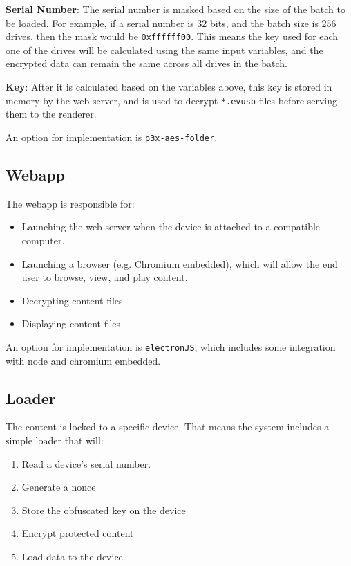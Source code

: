 \documentclass{article}
\begin{document}
{\bf Serial Number}: The serial number is masked based on the size of
the batch to be loaded.  For example, if a serial number is 32 bits,
and the batch size is 256 drives, then the mask would be \verb+0xffffff00+.
This means the key used for each one of the drives will be calculated
using the same input variables, and the encrypted data can remain
the same across all drives in the batch.

{\bf Key}: After it is calculated based on the variables above,
this key is stored in memory by the web server, and is used to decrypt
\verb+*.evusb+ files before serving them to the renderer.

An option for implementation is \verb+p3x-aes-folder+.

\subsection{Webapp}

The webapp is responsible for:
\begin{itemize}
\item Launching the web server when the device is attached to 
      a compatible computer.
\item Launching a browser (e.g. Chromium embedded), which will allow
      the end user to browse, view, and play content.
\item Decrypting content files
\item Displaying content files 
\end{itemize}

An option for implementation is \verb+electronJS+, which includes some 
integration with node and chromium embedded.

\subsection{Loader}

The content is locked to a specific device.  That means the system includes
a simple loader that will:
\begin{enumerate}
\item Read a device's serial number.
\item Generate a nonce
\item Store the obfuscated key on the device
\item Encrypt protected content
\item Load data to the device.
\end{enumerate}
\end{document}
